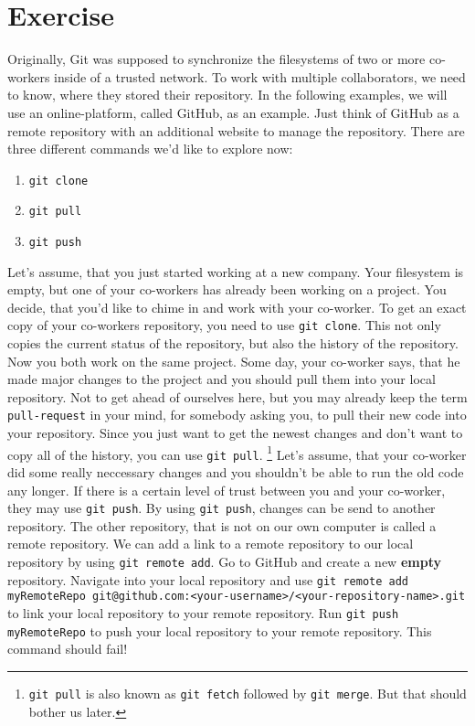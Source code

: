\documentclass{dcbl/challenge}
\begin{document}
\section*{Exercise}
\begin{aufgabe}
    Originally, Git was supposed to synchronize the filesystems of two or more co-workers inside of a trusted network.
    To work with multiple collaborators, we need to know, where they stored their repository. 
    In the following examples, we will use an online-platform, called GitHub, as an example.
    Just think of GitHub as a remote repository with an additional website to manage the repository.
    There are three different commands we'd like to explore now:
    \begin{enumerate}
        \item \texttt{git clone}
        \item \texttt{git pull}
        \item \texttt{git push}
    \end{enumerate}
    Let's assume, that you just started working at a new company.
    Your filesystem is empty, but one of your co-workers has already been working on a project.
    You decide, that you'd like to chime in and work with your co-worker.
    To get an exact copy of your co-workers repository, you need to use \texttt{git clone}.
    This not only copies the current status of the repository, but also the history of the repository.
    Now you both work on the same project. 
    Some day, your co-worker says, that he made major changes to the project and you should pull them into your local repository.
    Not to get ahead of ourselves here, but you may already keep the term \texttt{pull-request} in your mind, for somebody asking you, to pull their new code into your repository.
    Since you just want to get the newest changes and don't want to copy all of the history, you can use \texttt{git pull}.
    \footnote[1]{\texttt{git pull} is also known as \texttt{git fetch} followed by \texttt{git merge}. But that should bother us later.}
    Let's assume, that your co-worker did some really neccessary changes and you shouldn't be able to run the old code any longer.
    If there is a certain level of trust between you and your co-worker, they may use \texttt{git push}.
    By using \texttt{git push}, changes can be send to another repository. 
    The other repository, that is not on our own computer is called a remote repository. 
    We can add a link to a remote repository to our local repository by using \texttt{git remote add}.
    Go to GitHub and create a new \textbf{empty} repository.
    Navigate into your local repository and use \texttt{git remote add myRemoteRepo git@github.com:<your-username>/<your-repository-name>.git} to link your local repository to your remote repository.
    Run \texttt{git push myRemoteRepo} to push your local repository to your remote repository.
    This command should fail!
\end{aufgabe}
\end{document}
